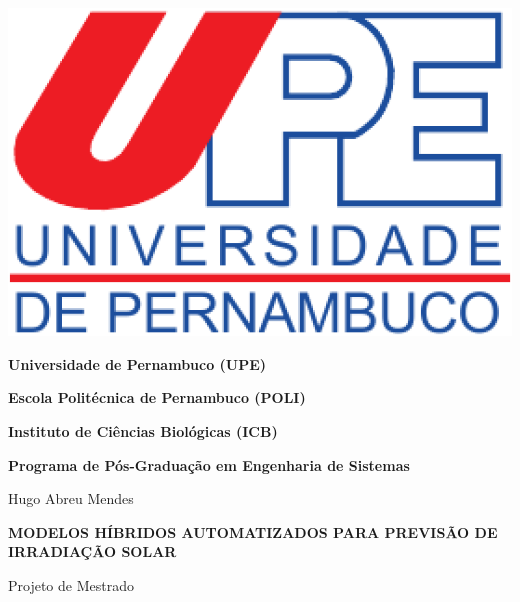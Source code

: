 \begin{center}
\begin{minipage}[b]{0.15\linewidth}
\end{minipage} \hfill
\begin{minipage}[b]{0.2\linewidth}
\includegraphics[width=\textwidth]{Figuras/Capa/upelogo.eps}
\end{minipage}


{\textbf{Universidade de Pernambuco (UPE)}} %

{\textbf{Escola Politécnica de Pernambuco (POLI)}} %

{\textbf{Instituto de Ciências Biológicas (ICB)}} \\ \vspace{1ex}

{\textbf{Programa de Pós-Graduação em Engenharia de Sistemas}} \\ \vspace{1ex}

\vspace{1.0in}

{\Large Hugo Abreu Mendes}

\vspace{1.3in}

{\Large \textbf{MODELOS HÍBRIDOS AUTOMATIZADOS PARA PREVISÃO DE IRRADIAÇÃO SOLAR}} \\

\vspace{1.4in}

{\large Projeto de Mestrado}

\vspace{1.6in}


\vspace{18pt}{Recife, Março de 2021.}

\end{center}